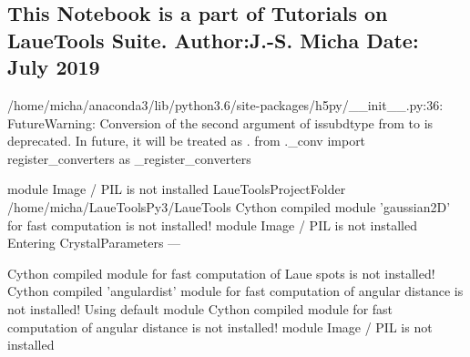 \documentclass[letterpaper,10pt,english]{sphinxmanual}
\begin{document}
\subsection{This Notebook is a part of Tutorials on LaueTools Suite. Author:J.-S. Micha Date: July 2019}
\label{\detokenize{Indexation:this-notebook-is-a-part-of-tutorials-on-lauetools-suite-author-j-s-micha-date-july-2019}}
%
\begin{sphinxVerbatim}[commandchars=\\\{\}]
 

 
   
   
 

   
   
   
   
\end{sphinxVerbatim}
\begin{sphinxalltt}
/home/micha/anaconda3/lib/python3.6/site-packages/h5py/\_\_init\_\_.py:36: FutureWarning: Conversion of the second argument of issubdtype from  to  is deprecated. In future, it will be treated as .
  from .\_conv import register\_converters as \_register\_converters
\end{sphinxalltt}
\begin{sphinxalltt}
module Image / PIL is not installed
LaueToolsProjectFolder /home/micha/LaueToolsPy3/LaueTools
Cython compiled module 'gaussian2D' for fast computation is not installed!
module Image / PIL is not installed
Entering CrystalParameters \sphinxstylestrong{**}---\sphinxstylestrong{***********************}


Cython compiled module for fast computation of Laue spots is not installed!
Cython compiled 'angulardist' module for fast computation of angular distance is not installed!
Using default module
Cython compiled module for fast computation of angular distance is not installed!
module Image / PIL is not installed
\end{sphinxalltt}
\end{document}
